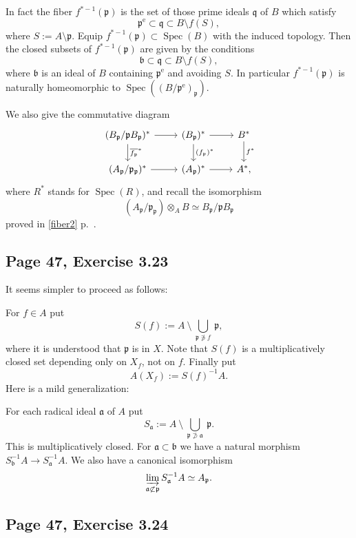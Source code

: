 \documentclass[parskip=half,fontsize=12pt]{scrartcl}%
\newcommand{\oo}{\operatorname}\newcommand{\ooo}{\operatorname*}
\newcommand{\mf}{\mathfrak}
\newcommand{\aaa}{\mf a}
\newcommand{\bbb}{\mf b}
\newcommand{\ppp}{\mf p}
\newcommand{\qqq}{\mf q}
\newcommand{\Spec}{\operatorname{Spec}}\newcommand{\Sp}{\operatorname{Spec}}
\begin{document}
In fact the fiber $f^{*-1}(\ppp)$ is the set of those prime ideals $\qqq$ of $B$ which satisfy 
$$
\ppp^{\oo{e}}\subset\qqq\subset B\setminus f(S),
$$ 
where $S:=A\setminus\ppp$. Equip $f^{*-1}(\ppp)\subset\Spec(B)$ with the induced topology. Then the closed subsets of $f^{*-1}(\ppp)$ are given by the conditions 
$$
\bbb\subset\qqq\subset B\setminus f(S),
$$ 
where $\bbb$ is an ideal of $B$ containing $\ppp^{\oo{e}}$ and avoiding $S$. In particular $f^{*-1}(\ppp)$ is naturally homeomorphic to $\Spec((B/\ppp^{\oo{e}})_\ppp)$.

We also give the commutative diagram
$$
\begin{tikzcd}
(B_\ppp/\ppp B_\ppp)^*\ar[d,"\overline{f_\ppp}^*"]\ar[r]&(B_\ppp)^*\ar[d,"(f_\ppp)^*"]\ar[r]& B^*\ar[d,"f^*"]\\ 
(A_\ppp/\ppp_\ppp)^*\ar[r]&(A_\ppp)^*\ar[r]& A^*,
\end{tikzcd}
$$ 
where $R^*$ stands for $\Spec(R)$, and recall the isomorphism 
$$
(A_\ppp/\ppp_\ppp)\otimes_AB\simeq B_\ppp/\ppp B_\ppp
$$ 
proved in \eqref{fiber2} p.~\pageref{fiber2}. %

\subsection{Page 47, Exercise 3.23}%

It seems simpler to proceed as follows:

For $f\in A$ put 
$$
S(f):=A\ \setminus\ \bigcup_{\ppp\notni f}\ \ppp,
$$ 
where it is understood that $\ppp$ is in $X$. Note that $S(f)$ is a multiplicatively closed set depending only on $X_f$, not on $f$. Finally put 
$$
A(X_f):=S(f)^{-1}A.
$$ 
Here is a mild generalization: 

For each radical ideal $\aaa$ of $A$ put 
$$
S_\aaa:=A\ \setminus\ \bigcup_{\ppp\not\supset\aaa}\ \ppp.
$$ 
This is multiplicatively closed. For $\aaa\subset\bbb$ we have a natural morphism $S_{\bbb}^{-1}A\to S_\aaa^{-1}A$. We also have a canonical isomorphism 
$$
\varinjlim_{\aaa\not\subset\ppp}S_\aaa^{-1}A\simeq A_\ppp.
$$

\subsection{Page 47, Exercise 3.24}%
\end{document}
